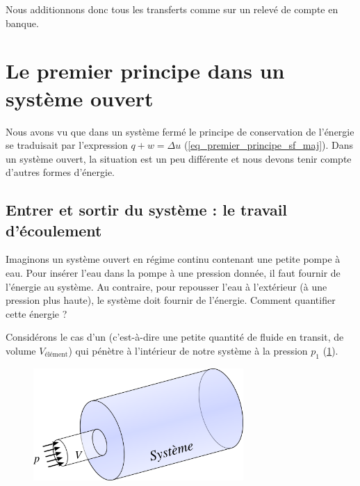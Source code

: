 		Nous additionnons donc tous les transferts comme sur un relevé de compte en banque.


\section{Le premier principe dans un système ouvert}

	Nous avons vu que dans un système fermé le principe de conservation de l’énergie se traduisait par l’expression $q + w = \Delta u$ (\ref{eq_premier_principe_sf_maj}). Dans un système ouvert, la situation est un peu différente et nous devons tenir compte d’autres formes d’énergie.

	\subsection{Entrer et sortir du système : le travail d’écoulement}

		Imaginons un système ouvert en régime continu contenant une petite pompe à eau. Pour insérer l’eau dans la pompe à une pression donnée, il faut fournir de l’énergie au système. Au contraire, pour repousser l’eau à l’extérieur (à une pression plus haute), le système doit fournir de l’énergie. Comment quantifier cette énergie ?

		Considérons le cas d’un  (c’est-à-dire une petite quantité de fluide en transit, de volume $V_\text{élément}$) qui pénètre à l’intérieur de notre système à la pression $p_1$ (\cref{fig_travail_ecoulement}).

		\begin{figure}
			\begin{center}
				\includegraphics[width=8cm]{images/travail_insertion.png}
			\end{center}
			\label{fig_travail_ecoulement}
		\end{figure}

